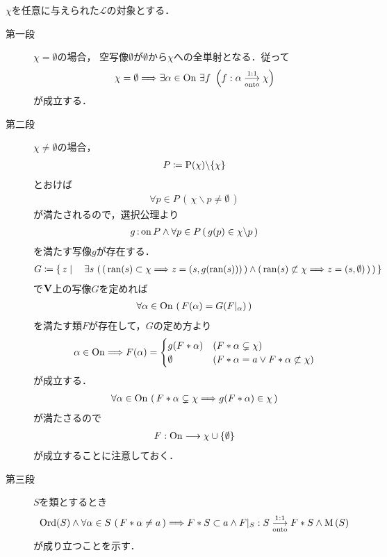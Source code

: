 	\begin{prf} $\chi$を任意に与えられた$\mathcal{L}$の対象とする．
		\begin{description}
			\item[第一段]
				$\chi = \emptyset$の場合，
				空写像$\emptyset$が$\emptyset$から$\chi$への全単射となる．従って
				\begin{align}
					\chi = \emptyset \Longrightarrow \exists \alpha \in \ON\ 
				\exists f\ \left( f:\alpha \bij \chi \right)
				\end{align}
				が成立する．
				
			\item[第二段]
				$\chi \neq \emptyset$の場合，
				\begin{align}
					P \coloneqq \operatorname*{P}(\chi) \backslash \{\chi\}
				\end{align}
				とおけば
				\begin{align}
					\forall p \in P\, (\, \chi \backslash p \neq \emptyset\, )
				\end{align}
				が満たされるので，選択公理より
				\begin{align}
					g \operatorname*{:on} P \wedge \forall p \in P\, (\, g(p) \in \chi \backslash p\, ) 
				\end{align}
				を満たす写像$g$が存在する．
				\begin{align}
					G \coloneqq \left\{\, z \mid \quad \exists s\, \left(\, 
						\left(\, \operatorname*{ran}(s) \subset \chi \Longrightarrow z=(s,g(\operatorname*{ran}(s)))\, \right) 
						\wedge \left(\, \operatorname*{ran}(s) \not\subset \chi \Longrightarrow z=(s,\emptyset)\, \right)\, \right)\, \right\}
				\end{align}
				で$\mathbf{V}$上の写像$G$を定めれば
				\begin{align}
					\forall \alpha \in \mathrm{On}\, \left(\, F(\alpha) = G(F|_\alpha)\, \right)
				\end{align}
				を満たす類$F$が存在して，$G$の定め方より
				\begin{align}
					\alpha \in \mathrm{On} \Longrightarrow F(\alpha) = 
					\begin{cases}
						g(F \ast \alpha) & (F \ast \alpha \subsetneq \chi) \\
						\emptyset & (F \ast \alpha = a \vee F \ast \alpha \not\subset \chi)
					\end{cases}
				\end{align}
				が成立する．
				\begin{align}
					\forall \alpha \in \mathrm{On}\, \left(\, 
					F \ast \alpha \subsetneq \chi \Longrightarrow g(F \ast \alpha) \in \chi\, \right)
				\end{align}
				が満たさるので
				\begin{align}
					F:\mathrm{On} \longrightarrow \chi \cup \{\emptyset\}
				\end{align}
				が成立することに注意しておく．
			
			\item[第三段]
				$S$を類とするとき
				\begin{align}
					\operatorname*{Ord}(S) \wedge \forall \alpha \in S\, \left(\, F \ast \alpha \neq a\, \right)
					\Longrightarrow F \ast S \subset a \wedge
					F|_S:S \underset{\mathrm{onto}}{\overset{\mathrm{1:1}}{\longrightarrow}} F \ast S \wedge \operatorname*{M}\left(S\right)
				\end{align}
				が成り立つことを示す．
		\end{description}
	\end{prf}